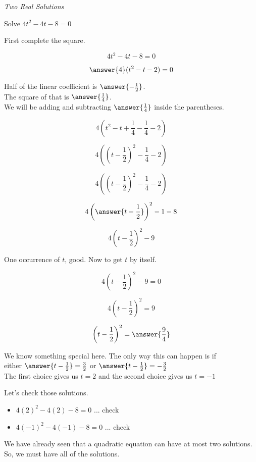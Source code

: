 \documentclass{ximera}
\begin{document}
\begin{example} \textit{Two Real Solutions}

Solve $4  t^2 - 4 t - 8 = 0$ \\


\begin{explanation}

First complete the square.



\[ 4 t^2 -  4 t - 8 = 0 \]

\[ \answer{4} (t^2 - t - 2) = 0 \]



Half of the linear coefficient is $\answer{-\frac{1}{2}}$. \\

The square of that is $\answer{\frac{1}{4}}$. \\

We will be adding and subtracting $\answer{\frac{1}{4}}$ inside the parentheses.




\[ 4 (t^2 - t + \frac{1}{4} - \frac{1}{4} - 2)  \]


\[ 4 \left(\left(t - \frac{1}{2}\right)^2 - \frac{1}{4} - 2\right)  \]


\[ 4 \left(\left(t - \frac{1}{2}\right)^2 - \frac{1}{4} - 2\right)  \]

\[ 4 \left( \answer{t - \frac{1}{2}} \right)^2 - 1 - 8  \]

\[ 4 \left(t - \frac{1}{2}\right)^2 - 9  \]


One occurrence of $t$, good. Now to get $t$ by itself.

\[ 4 \left(t - \frac{1}{2}\right)^2 - 9 = 0  \]

\[ 4 \left(t - \frac{1}{2}\right)^2 = 9  \]

\[  \left(t - \frac{1}{2}\right)^2 = \answer{\frac{9}{4}}  \]

We know something special here. The only way this can happen is if \\



either   $\answer{t - \frac{1}{2}} = \frac{3}{2}$  or  $\answer{t - \frac{1}{2}} = -\frac{3}{2}$ \\

The first choice gives us $t = 2$ and the second choice gives us $t = -1$




Let's check those solutions.

\begin{itemize}
\item $4 (2)^2 - 4 (2) - 8 = 0$ ... check
\item $4 (-1)^2 - 4 (-1) - 8 = 0$ ... check
\end{itemize}



We have already seen that a quadratic equation can have at most two solutions.  So, we must have all of the solutions.

\end{explanation}


\end{example}
\end{document}
